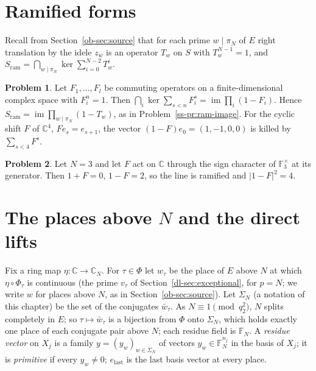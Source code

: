 \documentclass[reqno]{amsart}
\newcounter{chap}
\theoremstyle{plain}
\theoremstyle{definition}
\newtheorem{problem}{Problem}[section]
\theoremstyle{remark}
\newcommand{\C}{{\mathbb{C}}}
\newcommand{\F}{{\mathbb{F}}}
\newcommand{\ram}{\mathrm{ram}}
\newcommand{\elast}{e_{\mathrm{last}}}
\begin{document}
\section{Ramified forms}\label{sec:ramified}

Recall from Section~\ref{ob-sec:source} that for each prime \(w \mid \pi_N\) of \(E\) right translation by the idele \(z_w\) is an operator \(T_w\) on \(S\) with \(T_w^{N-1} = 1\), and \(S_\ram = \bigcap_{w \mid \pi_N}\ker\sum_{i=0}^{N-2}T_w^i\).

\begin{problem}\label{pr:ram-image}
Let \(F_1, \dots, F_l\) be commuting operators on a finite-dimensional complex space with \(F_i^n = 1\).  Then \(\bigcap_i \ker\sum_{s<n}F_i^s = \operatorname{im}\prod_i(1 - F_i)\).  Hence \(S_\ram = \operatorname{im}\prod_{w \mid \pi_N}(1 - T_w)\), as in Problem~\ref{ss-pr:ram-image}.  For the cyclic shift \(F\) of \(\C^4\), \(F e_s = e_{s+1}\), the vector \((1-F)e_0 = (1,-1,0,0)\) is killed by \(\sum_{s<4}F^s\).
\end{problem}

\begin{problem}\label{pr:sign}
Let \(N = 3\) and let \(F\) act on \(\C\) through the sign character of \(\F_3^\times\) at its generator.  Then \(1 + F = 0\), \(1 - F = 2\), so the line is ramified and \(\lvert 1 - F\rvert^2 = 4\).
\end{problem}

\section{The places above \texorpdfstring{\(N\)}{N} and the direct lifts}\label{sec:places}

Fix a ring map \(\eta\colon \C \to \C_N\).  For \(\tau \in \Phi\) let \(w_\tau\) be the place of \(E\) above \(N\) at which \(\eta \circ \Phi_\tau\) is continuous (the prime \(v_\tau\) of Section~\ref{dl-sec:exceptional}, for \(p = N\); we write \(w\) for places above \(N\), as in Section~\ref{ob-sec:source}).  Let \(\Sigma_N\) (a notation of this chapter) be the set of the conjugates \(\bar w_\tau\).  As \(N \equiv 1 \pmod{q_2^2}\), \(N\) splits completely in \(E\); so \(\tau \mapsto \bar w_\tau\) is a bijection from \(\Phi\) onto \(\Sigma_N\), which holds exactly one place of each conjugate pair above \(N\); each residue field is \(\F_N\).  A \emph{residue vector} on \(X_j\) is a family \(y = (y_w)_{w \in \Sigma_N}\) of vectors \(y_w \in \F_N^{n_j}\) in the basis of \(X_j\); it is \emph{primitive} if every \(y_w \ne 0\); \(\elast\) is the last basis vector at every place.
\end{document}
